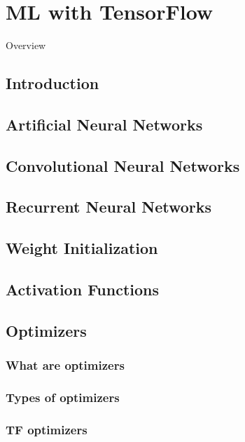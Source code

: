 \chapter{ML with TensorFlow}

Overview

\section{Introduction}

\section{Artificial Neural Networks}

\section{Convolutional Neural Networks}

\section{Recurrent Neural Networks}

\section{Weight Initialization}

\section{Activation Functions}

\section{Optimizers}

\subsection{What are optimizers}

\subsection{Types of optimizers}

\subsection{TF optimizers}

